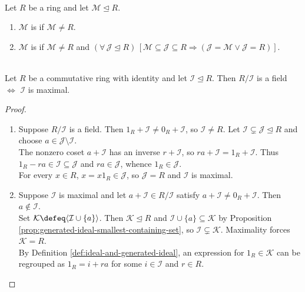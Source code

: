 \begin{definition} \label{def:maximal-ideal} \\
Let $R$ be a ring and let $\mathcal{M}\trianglelefteq R$.
\begin{enumerate}[label=(\roman*)]
\setlength{\itemsep}{0pt}
\item $\mathcal{M}$ is  if $\mathcal{M}\neq R$.
\item $\mathcal{M}$ is  if $\mathcal{M}\neq R$ and $(\forall\,\mathcal{J}\trianglelefteq R)\,[\mathcal{M}\subseteq\mathcal{J}\subseteq R\Rightarrow(\mathcal{J}=\mathcal{M}\lor\mathcal{J}=R)]$.
\end{enumerate}
\end{definition}

\begin{theorem} \label{thm:quotient-by-maximal-ideal-is-field} \\
Let $R$ be a commutative ring with identity and let $\mathcal{I}\trianglelefteq R$. Then $R/\mathcal{I}$ is a field $\iff$ $\mathcal{I}$ is maximal.
\begin{proof}
\begin{enumerate}[label=\roman*.]
\setlength{\itemsep}{0pt}
\item[$(\Rightarrow)$] Suppose $R/\mathcal{I}$ is a field. Then $1_R+\mathcal{I}\neq0_R+\mathcal{I}$, so $\mathcal{I}\neq R$. Let $\mathcal{I}\subsetneq\mathcal{J}\trianglelefteq R$ and choose $a\in\mathcal{J}\setminus\mathcal{I}$.\\
The nonzero coset $a+\mathcal{I}$ has an inverse $r+\mathcal{I}$, so $ra+\mathcal{I}=1_R+\mathcal{I}$. Thus $1_R-ra\in\mathcal{I}\subseteq\mathcal{J}$ and $ra\in\mathcal{J}$, whence $1_R\in\mathcal{J}$.\\
For every $x\in R$, $x=x1_R\in\mathcal{J}$, so $\mathcal{J}=R$ and $\mathcal{I}$ is maximal.
\item[$(\Leftarrow)$] Suppose $\mathcal{I}$ is maximal and let $a+\mathcal{I}\in R/\mathcal{I}$ satisfy $a+\mathcal{I}\neq0_R+\mathcal{I}$. Then $a\notin\mathcal{I}$.\\
Set $\mathcal{K}\defeq\langle\mathcal{I}\cup\{a\}\rangle$. Then $\mathcal{K}\trianglelefteq R$ and $\mathcal{I}\cup\{a\}\subseteq\mathcal{K}$ by Proposition \ref{prop:generated-ideal-smallest-containing-set}, so $\mathcal{I}\subsetneq\mathcal{K}$. Maximality forces $\mathcal{K}=R$.\\
By Definition \ref{def:ideal-and-generated-ideal}, an expression for $1_R\in\mathcal{K}$ can be regrouped as $1_R=i+ra$ for some $i\in\mathcal{I}$ and $r\in R$.\\

\end{enumerate}
\end{proof}
\end{theorem}
